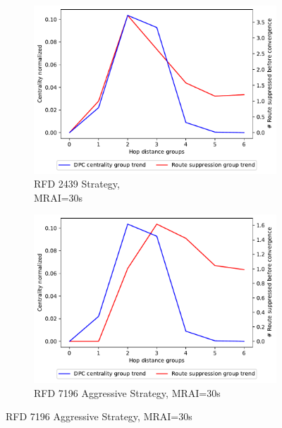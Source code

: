 \begin{figure}[H]
\begin{subfigure}[b]{0.325\textwidth}
     \end{subfigure}
     \vfill
     \begin{subfigure}[b]{0.325\textwidth}
         \centering
         \includegraphics[width=\textwidth]{images/RFD/miceVSelephants/MultiMRAI/30/mice/cisco_1000_RFD_nodeConvergence_centVSsup_trend.pdf}
         \caption{RFD 2439 Strategy, \\MRAI=30s}
         \label{fig:1000_2439RFD_centVSsup_mices}
     \end{subfigure}
     \hfill
     \begin{subfigure}[b]{0.325\textwidth}
         \centering
         \includegraphics[width=\textwidth]{images/RFD/miceVSelephants/MultiMRAI/30/mice/cisco_1000_RFD_7196_aggressive_nodeConvergence_centVSsup_trend.pdf}
         \caption{RFD 7196 Aggressive Strategy, MRAI=30s}
         \label{fig:1000_7196RFDA_centVSsup_mices}

\end{subfigure}
\end{figure}

